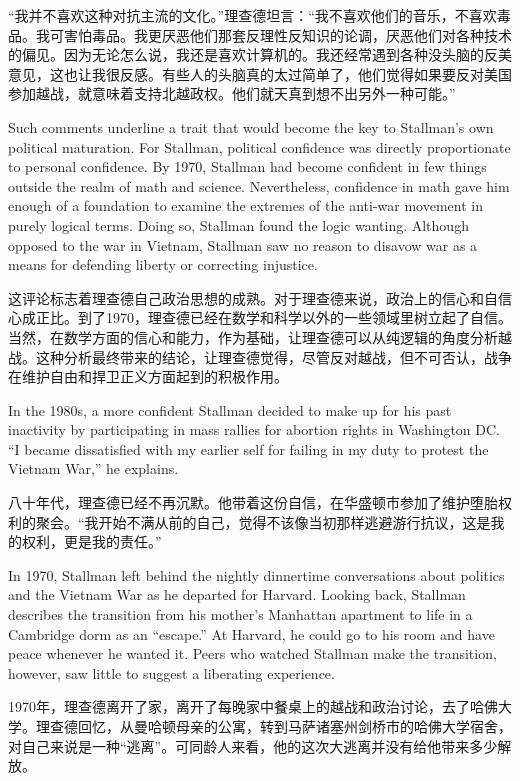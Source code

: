 \ifdefined\chs
“我并不喜欢这种对抗主流的文化。”理查德坦言：“我不喜欢他们的音乐，不喜欢毒品。我可害怕毒品。我更厌恶他们那套反理性反知识的论调，厌恶他们对各种技术的偏见。因为无论怎么说，我还是喜欢计算机的。我还经常遇到各种没头脑的反美意见，这也让我很反感。有些人的头脑真的太过简单了，他们觉得如果要反对美国参加越战，就意味着支持北越政权。他们就天真到想不出另外一种可能。”
\fi

\ifdefined\eng
Such comments underline a trait that would become the key to Stallman's own political maturation. For Stallman, political confidence was directly proportionate to personal confidence. By 1970, Stallman had become confident in few things outside the realm of math and science. Nevertheless, confidence in math gave him enough of a foundation to examine the extremes of the anti-war movement in purely logical terms.  Doing so, Stallman found the logic wanting. Although opposed to the war in Vietnam, Stallman saw no reason to disavow war as a means for defending liberty or correcting injustice.
\fi

\ifdefined\chs
这评论标志着理查德自己政治思想的成熟。对于理查德来说，政治上的信心和自信心成正比。到了1970，理查德已经在数学和科学以外的一些领域里树立起了自信。当然，在数学方面的信心和能力，作为基础，让理查德可以从纯逻辑的角度分析越战。这种分析最终带来的结论，让理查德觉得，尽管反对越战，但不可否认，战争在维护自由和捍卫正义方面起到的积极作用。
\fi

\ifdefined\eng
In the 1980s, a more confident Stallman decided to make up for his past inactivity by participating in mass rallies for abortion rights in Washington DC.  ``I became dissatisfied with my earlier self for failing in my duty to protest the Vietnam War,'' he explains.
\fi

\ifdefined\chs
八十年代，理查德已经不再沉默。他带着这份自信，在华盛顿市参加了维护堕胎权利的聚会。“我开始不满从前的自己，觉得不该像当初那样逃避游行抗议，这是我的权利，更是我的责任。”
\fi

\ifdefined\eng
In 1970, Stallman left behind the nightly dinnertime conversations about politics and the Vietnam War as he departed for Harvard. Looking back, Stallman describes the transition from his mother's Manhattan apartment to life in a Cambridge dorm as an ``escape.'' At Harvard, he could go to his room and have peace whenever he wanted it. Peers who watched Stallman make the transition, however, saw little to suggest a liberating experience.
\fi

\ifdefined\chs
1970年，理查德离开了家，离开了每晚家中餐桌上的越战和政治讨论，去了哈佛大学。理查德回忆，从曼哈顿母亲的公寓，转到马萨诸塞州剑桥市的哈佛大学宿舍，对自己来说是一种“逃离”。可同龄人来看，他的这次大逃离并没有给他带来多少解放。
\fi

